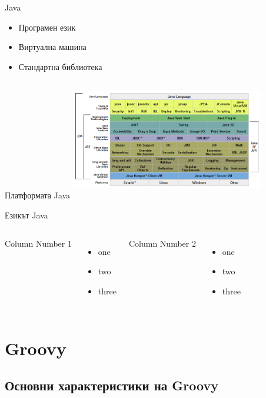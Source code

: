 \documentclass[compress,red]{beamer}
\begin{document}
\begin{frame}{Java}
  \transdissolve
  \begin{itemize}
  \item Програмен език
  \item Виртуална машина
  \item Стандартна библиотека
  \end{itemize}
\end{frame}

\begin{frame}{Платформата Java}
  \transdissolve
  \includegraphics[height=200px, width=320px]{images/JavaPlatform.png}
\end{frame}

\begin{frame}{Езикът Java}
  \transdissolve
  \begin{columns}
    Column Number 1
    \begin{itemize}
      \item one
      \item two
      \item three
    \end{itemize}
    Column Number 2
    \begin{itemize}
      \item one
      \item two
      \item three
    \end{itemize}

  \end{columns}
\end{frame}

\section{Groovy}
\subsection{Основни характеристики на Groovy}
\end{document}

